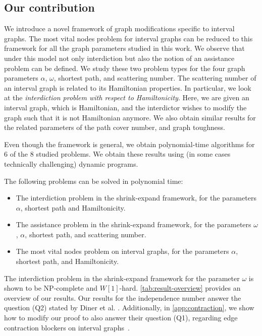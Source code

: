 
\subsection{Our contribution} 
We introduce a novel framework of graph modifications  
specific to interval graphs. The most vital nodes problem for interval graphs can be reduced to  this framework for all the graph parameters studied in this work. We observe that under this model not only interdiction but also the 
notion of an assistance problem can be defined. 
We study these two problem types for the four graph parameters $\alpha$, $\omega$, shortest path, and scattering number. The scattering number of an interval graph is related to its Hamiltonian properties. In particular, we look at the \emph{interdiction problem with respect to Hamiltonicity}. Here, we are given an interval graph, which is Hamiltonian, and the interdictor wishes to modify the graph such that it is not Hamiltonian anymore.
We also obtain similar results for the related parameters of the path cover number, and graph toughness.

Even though the framework is general, we obtain polynomial-time algorithms
for 6 of the 8 studied problems. We obtain these results using (in some cases technically challenging) dynamic programs. 

\begin{theorem}
The following problems can be solved in polynomial time:
\begin{itemize}
\item The interdiction problem in the shrink-expand framework, for the parameters $\alpha$,  shortest path and Hamiltonicity.
\item The assistance problem in the shrink-expand framework, for the parameters $\omega$, $\alpha$, shortest path, and scattering number.
\item The most vital nodes problem on interval graphs, for the parameters $\alpha$, shortest path, and Hamiltonicity.
\end{itemize}
\end{theorem}

The interdiction problem in the shrink-expand framework for the parameter $\omega$ is shown to be NP-complete and $W[1]$-hard. \cref{tab:result-overview} provides an overview of our results. 
Our results for the independence number answer the question (Q2) stated by Diner et al. \cite[(Q2)]{diner2018contractionDeletionBlockers}. Additionally, in \cref{app:contraction}, we show how to modify our proof to also answer their question (Q1), regarding edge contraction blockers on interval graphs~\cite[(Q1)]{diner2018contractionDeletionBlockers}.

